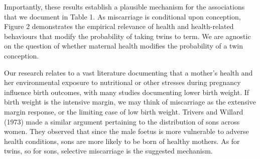 \documentclass{nature}
\begin{document}
\begin{linenumbers}
Importantly, these results establish a plausible mechanism for the associations that we document in Table 1. %
As miscarriage is conditional upon conception, Figure 2 demonstrates the empirical relevance of health and health-related behaviours that modify the probability of taking twins to term. %
We are agnostic on the question of whether maternal health modifies the probability of a twin conception.  


Our research relates to a vast literature documenting that a mother's health and her environmental exposure to nutritional or other stresses during pregnancy influence birth outcomes, with many studies documenting lower birth weight\cite{CurrieMoretti2007,Bernsteinetal2005,SerranoDomeque2014}. If birth weight is the intensive margin, we may think of miscarriage as the extensive margin response, or the limiting case of low birth weight. %
Trivers and Willard (1973) made a similar argument pertaining to the distribution of sons across women. They observed that since the male foetus is more vulnerable to adverse health conditions, sons are more likely to be born of healthy mothers. As for twins, so for sons, selective miscarriage is the suggested mechanism.



\end{linenumbers}
\end{document}
